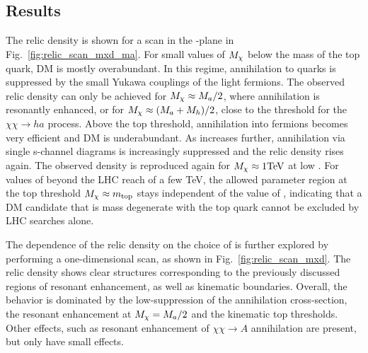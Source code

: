 \subsection{Results}
The relic density is shown for a scan in the \ma-\mDM plane in Fig.~\ref{fig:relic_scan_mxd_ma}.
For small values of $M_{\chi}$ below the mass of the top quark, DM is mostly overabundant. In this regime, annihilation to quarks is suppressed by the small Yukawa couplings of the light fermions. The observed relic density can only be achieved for $M_{\chi}\approx M_{a}/2$, where annihilation is resonantly enhanced, or for $M_{\chi} \approx (M_{a}+M_{h})/2$, close to the threshold for the $\chi\chi\rightarrow h a$ process.
Above the top threshold, annihilation into fermions becomes very efficient and DM is underabundant. As \mDM increases further, annihilation via single s-channel diagrams is increasingly suppressed and the relic density rises again. The observed density is reproduced again for $M_{\chi}\approx1 \mathrm{TeV}$ at low \ma.
For values of \ma beyond the LHC reach of a few TeV, the allowed parameter region at the top threshold $M_{\chi}\approx m_{\mathrm{top}}$ stays independent of the value of \ma, indicating that a DM candidate that is mass degenerate with the top quark cannot be excluded by LHC searches alone.

The dependence of the relic density on the choice of \mDM is further explored by performing a one-dimensional scan, as shown in Fig.~\ref{fig:relic_scan_mxd}. The relic density shows clear structures corresponding to the previously discussed regions of resonant enhancement, as well as kinematic boundaries. Overall, the behavior is dominated by the low-\mDM suppression of the annihilation cross-section, the resonant enhancement at $M_{\chi} = M_{a}/2$ and the kinematic top thresholds. Other effects, such as resonant enhancement of $\chi\chi\rightarrow A$ annihilation are present, but only have small effects. 

